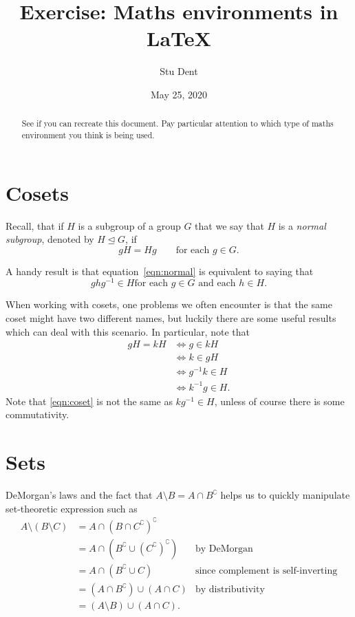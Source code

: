 \documentclass[a4paper,11pt]{article}
\title{Exercise: Maths environments in \LaTeX }
\author{Stu Dent}
\date{May 25, 2020}
\begin{document}
\maketitle

\begin{abstract}
See if you can recreate this document. Pay particular attention to which type of maths environment you think is being used.
\end{abstract}

\section{Cosets}

Recall, that if $H$ is a subgroup of a group $G$ that we say that $H$ is a \emph{normal subgroup}, denoted by $H \trianglelefteq G$, if \begin{equation}\label{eqn:normal}
gH=Hg \qquad \text{for each } g \in G.
\end{equation}

A handy result is that equation~\ref{eqn:normal} is equivalent to saying that \begin{equation*}
ghg^{-1} \in H \text{for each $g \in G$ and each $h \in H$}.
\end{equation*}

When working with cosets, one problems we often encounter is that the same coset might have two different names, but luckily there are some useful results which can deal with this scenario. In particular, note that \begin{align*}
gH=kH &\iff g \in kH \\
&\iff k \in gH \\
&\iff g^{-1}k \in H \tag{\dag}\label{eqn:coset}\\
&\iff k^{-1}g \in H.
\end{align*}
Note that \eqref{eqn:coset} is not the same as $kg^{-1} \in H$, unless of course there is some commutativity.

\newpage

\section{Sets}

DeMorgan's laws and the fact that $A\setminus B = A \cap B^\complement$ helps us to quickly manipulate set-theoretic expression such as \begin{align*}
A \setminus (B\setminus C) &= A\cap (B\cap C^\complement)^\complement \\
&= A\cap (B^\complement \cup (C^\complement)^\complement) & \text{by DeMorgan} \\
&= A\cap (B^\complement \cup C) & \text{since complement is self-inverting} \\
&= (A\cap B^\complement) \cup (A\cap C) & \text{by distributivity} \\
&= (A\setminus B) \cup(A \cap C).
\end{align*}
\end{document}

